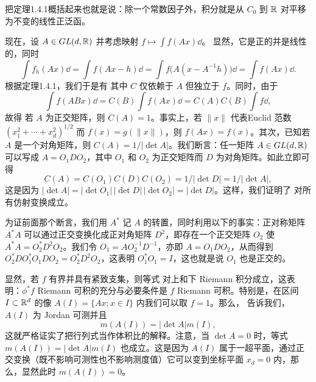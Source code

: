 把定理1.4.1概括起来也就是说：除一个常数因子外，积分就是从 $C_0$ 到 $\mathbb R$ 对平移为不变的线性正泛函。

现在，设 $A\in GL(d,\mathbb R)$ 并考虑映射 $f\mapsto\int f(Ax)\dd$。
显然，它是正的并是线性的，同时
\[\int f_h(Ax)\dd=\int f(Ax-h)\dd=\int f\bigl(A(x-A^{-1}h)\bigr)\dd=\int f(Ax)\dd.\]
根据定理1.4.1，我们于是有
其中 $C$ 仅依赖于 $A$ 但独立于 $f$。同时，由于
\[\int f(ABx)\dd=C(B)\int f(Ax)\dd=C(A)C(B)\int f\dd,\]
故得
若 $A$ 为正交矩阵，则 $C(A)=1$。事实上，若 $\|x\|$ 代表Euclid 范数 $(x_1^2+\cdots+x_d^2)^{1/2}$ 而 $f(x)=g(\|x\|)$，则 $f(Ax)=f(x)$。其次，已知若 $A$ 是一个对角矩阵，则 $C(A)=1/|\det A|$。我们断言：任一矩阵 $A\in GL(d,\mathbb R)$ 可以写成 $A=O_1DO_2$，其中 $O_1$ 和 $O_2$ 为正交矩阵而 $D$ 为对角矩阵。如此立即可得
\[C(A)=C(O_1)C(D)C(O_2)=1/|\det D|=1/|\det A|,\]
这是因为 $|\det A|=|\det O_1|\,|\det D|\,|\det O_2|=|\det D|$。这样，我们证明了  对所有仿射变换成立。

为证前面那个断言，我们用 $A^*$ 记 $A$ 的转置，同时利用以下的事实：正对称矩阵 $A^*A$ 可以通过正交变换化成正对角矩阵 $D^2$，即存在一个正交矩阵 $O_2$ 使 $A^*A=O_2^*D^2O_2$。我们令 $O_1=AO_2^{-1}D^{-1}$，亦即 $A=O_1DO_2$，从而得到 $O_2^*DO_1^*O_1DO_2=O_2^*D^2O_2$，这表明 $O_1^*O_1=I$，这也就是说 $O_1$ 也是正交的。

显然，若 $f$ 有界并具有紧致支集，则等式  对上和下 Riemann 积分成立，这表明：$\phi^*f$ Riemann 可积的充分与必要条件是 $f$ Riemann 可积。特别是，在区间 $I\subset\mathbb R^d$ 的像 $A(I)=\{Ax;x\in I\}$ 内我们可以取 $f=1$。那么， 告诉我们，$A(I)$ 为 Jordan 可测并且
\[m(A(I))=|\det A|m(I),\]
这就严格证实了把行列式当作体积比的解释。注意，当 $\det A=0$ 时，等式 $m(A(I))=|\det A|m(I)$ 也成立。这是因为 $A(I)$ 属于一超平面，通过正交变换（既不影响可测性也不影响测度值）它可以变到坐标平面 $x_d=0$ 内，那么，显然此时 $m(A(I))=0$。


